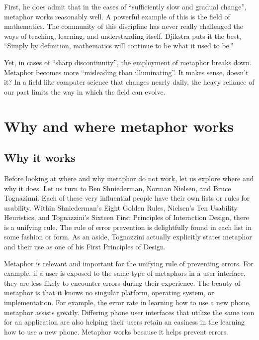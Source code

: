 \documentclass[11pt, oneside]{article}
\begin{document}
First, he does admit that in the cases of ``sufficiently slow and gradual change'', metaphor works reasonably well. A powerful example of this is the field of mathematics. The community of this discipline has never really challenged the ways of teaching, learning, and understanding itself. Djikstra puts it the best, ``Simply by definition, mathematics will continue to be what it used to be.''

Yet, in cases of ``sharp discontinuity'', the employment of metaphor breaks down. Metaphor becomes more ``misleading than illuminating''. It makes sense, doesn't it? In a field like computer science that changes nearly daily, the heavy reliance of our past limits the way in which the field can evolve.
\cite{ewd1036}

\section{Why and where metaphor works}
\subsection{Why it works}
Before looking at where and why metaphor do not work, let us explore where and why it does. Let us turn to Ben Shniederman, Norman Nielsen, and Bruce Tognazinni. Each of these very influential people have their own lists or rules for usability. Within Shniederman's Eight Golden Rules, Nielsen's Ten Usability Heuristics, and Tognazzini's Sixteen First Principles of Interaction Design, there is a unifying rule. The rule of error prevention is delightfully found in each list in some fashion or form. \cite{shniederman-golden-rules} \cite{tognazzini-first-principles} \cite{nielsen-usability-heuristics} As an aside, Tognazzini actually explicitly states metaphor and their use as one of his First Principles of Design.

Metaphor is relevant and important for the unifying rule of preventing errors. For example, if a user is exposed to the same type of metaphors in a user interface, they are less likely to encounter errors during their experience. The beauty of metaphor is that it knows no singular platform, operating system, or implementation. For example, the error rate in learning how to use a new phone, metaphor assists greatly. Differing phone user interfaces that utilize the same icon for an application are also helping their users retain an easiness in the learning how to use a new phone. Metaphor works because it helps prevent errors.
\end{document}

